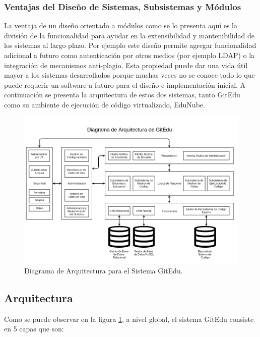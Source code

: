 \subsubsection{Ventajas del Diseño de Sistemas, Subsistemas y Módulos}
La ventaja de un diseño orientado a módulos como se lo presenta aquí es la división de la funcionalidad para ayudar en la extensibilidad y mantenibilidad de los sistemas al largo plazo. Por ejemplo este diseño permite agregar funcionalidad adicional a futuro como autenticación por otros medios (por ejemplo LDAP) o la integración de mecanismos anti-plagio. Esta propiedad puede dar una vida útil mayor a los sistemas desarrollados porque muchas veces no se conoce todo lo que puede requerir un software a futuro para el diseño e implementación inicial. A continuación se presenta la arquitectura de estos dos sistemas, tanto GitEdu como su ambiente de ejecución de código virtualizado, EduNube.

\pagebreak

\begin{landscape}

	\begin{figure}
	  \begin{center}
	    \includegraphics[width=1.0\textwidth]{Figures/arq_ge.png}
	  \end{center}
	  \caption{Diagrama de Arquitectura para el Sistema GitEdu.}
	  \label{arq_ge}
	\end{figure}

\end{landscape}

\subsection{Arquitectura}
Como se puede observar en la figura \ref{arq_ge}, a nivel global, el sistema GitEdu consiste en 5 capas que son:

